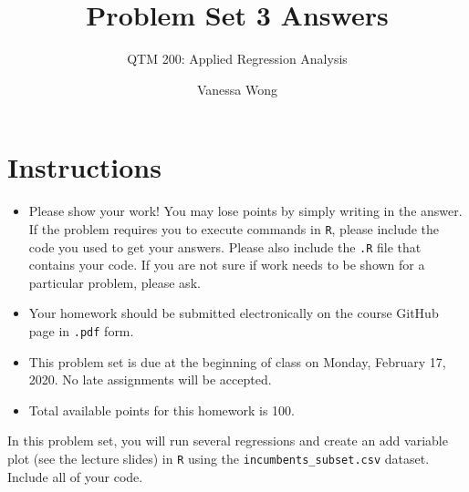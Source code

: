 \documentclass[12pt,letterpaper]{article}
\title{Problem Set 3 Answers}
\date{Vanessa Wong}
\author{QTM 200: Applied Regression Analysis}
\begin{document}
	\maketitle
	\section*{Instructions}
	\begin{itemize}
		\item Please show your work! You may lose points by simply writing in the answer. If the problem requires you to execute commands in \texttt{R}, please include the code you used to get your answers. Please also include the \texttt{.R} file that contains your code. If you are not sure if work needs to be shown for a particular problem, please ask.
		\item Your homework should be submitted electronically on the course GitHub page in \texttt{.pdf} form.
		\item This problem set is due at the beginning of class on Monday, February 17, 2020. No late assignments will be accepted.
		\item Total available points for this homework is 100.
	\end{itemize}
	
		\vspace{.25cm}
	
\noindent In this problem set, you will run several regressions and create an add variable plot (see the lecture slides) in \texttt{R} using the \texttt{incumbents\_subset.csv} dataset. Include all of your code.

	\vspace{.5cm}
\end{document}
